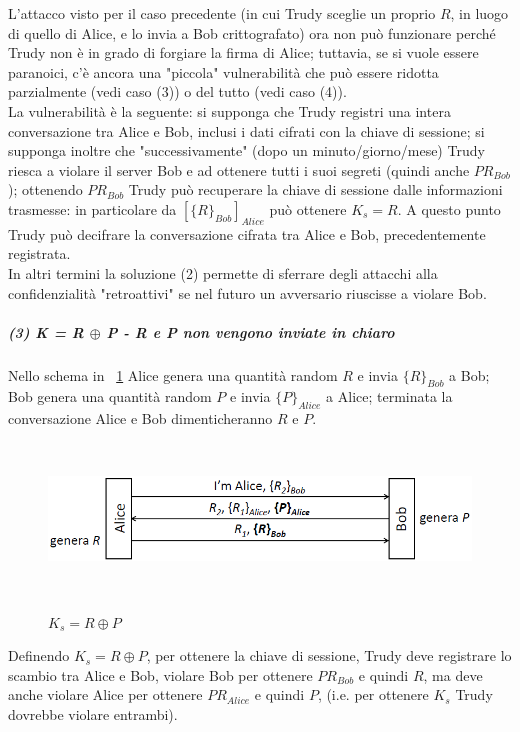 L'attacco visto per il caso precedente (in cui Trudy sceglie un proprio $R$, in luogo di quello di Alice, e lo invia a Bob crittografato) ora non può funzionare perché Trudy non è in grado di forgiare la firma di Alice; tuttavia, se si vuole essere paranoici, c'è ancora una "piccola" vulnerabilità che può essere ridotta parzialmente (vedi caso (3)) o del tutto (vedi caso (4)). \\
La vulnerabilità è la seguente: si supponga che Trudy registri una intera conversazione tra Alice e Bob, inclusi i dati cifrati con la chiave di sessione; si supponga inoltre che "successivamente" (dopo un minuto/giorno/mese) Trudy riesca a violare il server Bob e ad ottenere tutti i suoi segreti (quindi anche $PR_{Bob}$); ottenendo $PR_{Bob}$ Trudy può recuperare la chiave di sessione dalle informazioni trasmesse: in particolare da $[\lbrace R\rbrace_{Bob}]_{Alice}$ può ottenere $K_{s} = R$. A questo punto Trudy può decifrare la conversazione cifrata tra Alice e Bob, precedentemente registrata.\\
In altri termini la soluzione (2) permette di sferrare degli attacchi alla confidenzialità "retroattivi" se nel futuro un avversario riuscisse a violare Bob.
\subparagraph{(3) \textit{K = R $\oplus$ P}  - R e P non vengono inviate in chiaro}
Nello schema in \figurename~\ref{fig:ImgS74bis} Alice genera una quantità random $R$ e invia $\lbrace R\rbrace_{Bob}$ a Bob; Bob genera una quantità random $P$ e invia $\lbrace P\rbrace_{Alice}$ a Alice; terminata la conversazione Alice e Bob dimenticheranno $R$ e $P$.
\begin{figure}[htbp]
	\centering%
	\subfigure%
	{\includegraphics[height=4cm, width=12cm, keepaspectratio]{Immagini/autenticazione/ImgS74bis.png}}
	\caption{$K_{s} = R \oplus P$}\label{fig:ImgS74bis} 	
\end{figure}
Definendo $K_{s} = R \oplus P$, per ottenere la chiave di sessione, Trudy deve registrare lo scambio tra Alice e Bob,  violare Bob per ottenere $PR_{Bob}$ e quindi $R$, ma deve anche violare Alice per ottenere $PR_{Alice}$ e quindi $P$, (i.e. per ottenere $K_{s}$ Trudy dovrebbe violare entrambi).
